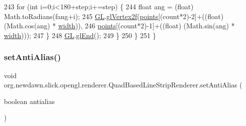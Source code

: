 \begin{DoxyCode}
243                 \textcolor{keywordflow}{for} (\textcolor{keywordtype}{int} i=0;i<180+step;i+=step) \{
244                     \textcolor{keywordtype}{float} ang = (float) Math.toRadians(fang+i);
245                     \mbox{\hyperlink{classorg_1_1newdawn_1_1slick_1_1opengl_1_1renderer_1_1_quad_based_line_strip_renderer_ab36a5a8e7bcb8704c798871b732b0ca5}{GL}}.\mbox{\hyperlink{interfaceorg_1_1newdawn_1_1slick_1_1opengl_1_1renderer_1_1_s_g_l_ad9c89f8bb275f22956f7687da5ec27c5}{glVertex2f}}(\mbox{\hyperlink{classorg_1_1newdawn_1_1slick_1_1opengl_1_1renderer_1_1_quad_based_line_strip_renderer_adeb4716a8ddb005cec7c3cc2ed9042e3}{points}}[(count*2)-2]+((\textcolor{keywordtype}{float}) (Math.cos(ang) * 
      \mbox{\hyperlink{classorg_1_1newdawn_1_1slick_1_1opengl_1_1renderer_1_1_quad_based_line_strip_renderer_a2ea1970be2e402b69b69f7cefbf41c52}{width}})), 
246                                   \mbox{\hyperlink{classorg_1_1newdawn_1_1slick_1_1opengl_1_1renderer_1_1_quad_based_line_strip_renderer_adeb4716a8ddb005cec7c3cc2ed9042e3}{points}}[(count*2)-1]+((\textcolor{keywordtype}{float}) (Math.sin(ang) * 
      \mbox{\hyperlink{classorg_1_1newdawn_1_1slick_1_1opengl_1_1renderer_1_1_quad_based_line_strip_renderer_a2ea1970be2e402b69b69f7cefbf41c52}{width}})));
247                 \}
248                 \mbox{\hyperlink{classorg_1_1newdawn_1_1slick_1_1opengl_1_1renderer_1_1_quad_based_line_strip_renderer_ab36a5a8e7bcb8704c798871b732b0ca5}{GL}}.\mbox{\hyperlink{interfaceorg_1_1newdawn_1_1slick_1_1opengl_1_1renderer_1_1_s_g_l_a7f5666aaa59b12617ab81e1263140f72}{glEnd}}();
249             \}
250         \}
251     \}
\end{DoxyCode}
\mbox{\label{classorg_1_1newdawn_1_1slick_1_1opengl_1_1renderer_1_1_quad_based_line_strip_renderer_a5eb1002e1c8f2d044bc1d1e184bcbc62}} 
\subsubsection{\texorpdfstring{set\+Anti\+Alias()}{setAntiAlias()}}
{\footnotesize\ttfamily void org.\+newdawn.\+slick.\+opengl.\+renderer.\+Quad\+Based\+Line\+Strip\+Renderer.\+set\+Anti\+Alias (\begin{DoxyParamCaption}\item[{boolean}]{antialias }\end{DoxyParamCaption})\hspace{0.3cm}{\ttfamily [inline]}}

